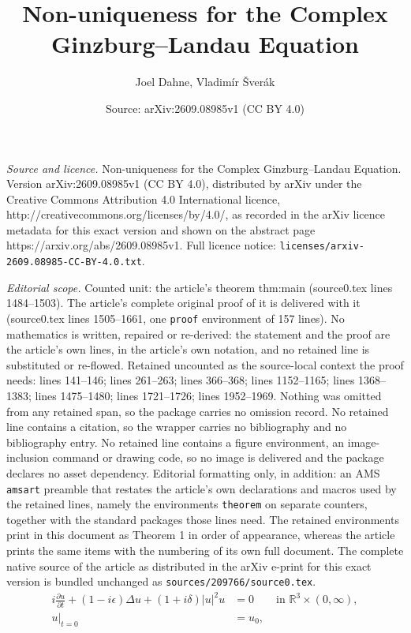 \documentclass[10pt,a4paper]{amsart}
\title{Non-uniqueness for the Complex Ginzburg--Landau Equation}
\author{Joel Dahne, Vladimír Šverák}
\date{Source: arXiv:2609.08985v1 (CC BY 4.0)}
\begin{document}
\maketitle

\noindent\emph{Source and licence.} Non-uniqueness for the Complex Ginzburg--Landau Equation. Version arXiv:2609.08985v1 (CC BY 4.0), distributed by arXiv under the Creative Commons Attribution 4.0 International licence, http://creativecommons.org/licenses/by/4.0/, as recorded in the arXiv licence metadata for this exact version and shown on the abstract page https://arxiv.org/abs/2609.08985v1. Full licence notice: \texttt{licenses/arxiv-2609.08985-CC-BY-4.0.txt}.\par\smallskip

\noindent\textit{Editorial scope.} Counted unit: the article's theorem thm:main (source0.tex lines 1484--1503). The article's complete original proof of it is delivered with it (source0.tex lines 1505--1661, one \texttt{proof} environment of 157 lines). No mathematics is written, repaired or re-derived: the statement and the proof are the article's own lines, in the article's own notation, and no retained line is substituted or re-flowed.  Retained uncounted as the source-local context the proof needs: lines 141--146; lines 261--263; lines 366--368; lines 1152--1165; lines 1368--1383; lines 1475--1480; lines 1721--1726; lines 1952--1969.  Nothing was omitted from any retained span, so the package carries no omission record.  No retained line contains a citation, so the wrapper carries no bibliography and no bibliography entry.  No retained line contains a figure environment, an image-inclusion command or drawing code, so no image is delivered and the package declares no asset dependency.  Editorial formatting only, in addition: an AMS \texttt{amsart} preamble that restates the article's own declarations and macros used by the retained lines, namely the environments \texttt{theorem} on separate counters, together with the standard packages those lines need.  The retained environments print in this document as Theorem 1 in order of appearance, whereas the article prints the same items with the numbering of its own full document.  The complete native source of the article as distributed in the arXiv e-print for this exact version is bundled unchanged as \texttt{sources/209766/source0.tex}.
\begin{equation}\label{eq:CGL}
  \begin{split}
    i \frac{\partial u}{\partial t} + (1 - i\epsilon)\Delta u + (1 + i\delta)|u|^{2}u &= 0 \qquad\text{in }\mathbb{R}^{3} \times (0, \infty),\\
    u|_{t=0} &= u_{0},
  \end{split}
\end{equation}
\end{document}

